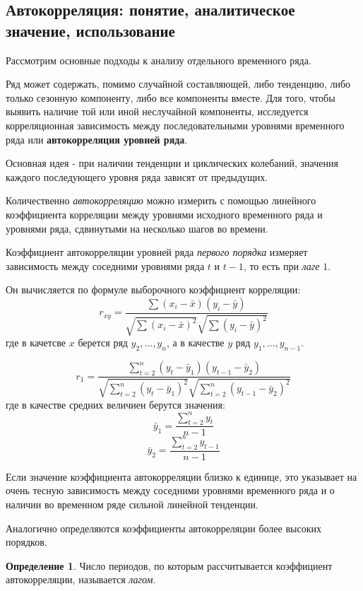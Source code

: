 \documentclass[aps,%
12pt,%
final,%
oneside,
onecolumn,%
musixtex, %
superscriptaddress,%
centertags]{article} %
\theoremstyle{plain}
\theoremstyle{definition}
\newtheorem{definition}{Определение}[subsection]
\theoremstyle{remark}
\begin{document}
\newpage
\subsection{Автокорреляция: понятие, аналитическое значение, использование}

Рассмотрим основные подходы к анализу отдельного временного ряда. 

Ряд может содержать, помимо случайной составляющей, либо тенденцию, либо только сезонную компоненту, либо все компоненты вместе. Для того, чтобы выявить наличие той или иной неслучайной компоненты, исследуется корреляционная зависимость между последовательными уровнями временного ряда или \textbf{автокорреляция уровней ряда}.

Основная идея - при наличии тенденции и циклических колебаний, значения каждого последующего уровня ряда зависят от предыдущих.

Количественно \textit{автокорреляцию} можно измерить с помощью линейного коэффициента корреляции между уровнями исходного временного ряда и уровнями ряда, сдвинутыми на несколько шагов во времени.

Коэффициент автокорреляции уровней ряда \textit{первого порядка} измеряет зависимость между соседними уровнями ряда $t$ и $t-1$, то есть при \textit{лаге} $1$.

Он вычисляется по формуле выборочного коэффициент корреляции:
$$r_{xy} = \frac{\sum(x_i-\bar{x})(y_i - \bar{y})}{\sqrt{\sum(x_i - \bar{x})^2}\sqrt{\sum(y_i - \bar{y})^2}}$$
где в качетсве $x$ берется ряд $y_2,\ldots,y_n$, а в качестве $y$ ряд $y_1,\ldots,y_{n-1}$.

$$r_1 = \frac{\sum\limits_{t=2}^n (y_t - \bar{y}_1)(y_{t-1}-\bar{y}_2)}{\sqrt{\sum\limits_{t=2}^n (y_t - \bar{y}_1)^2 }\sqrt{\sum\limits_{t=2}^n (y_{t-1} - \bar{y}_2)^2 }}$$
где в качестве средних величиен берутся значения:
$$\bar{y}_1 = \frac{\sum\limits_{t=2}^n y_t}{n-1}$$
$$\bar{y}_2 = \frac{\sum\limits_{t=2}^n y_{t-1}}{n-1}$$

Если значение коэффициента автокорреляции близко к единице, это указывает на очень тесную зависимость между соседними уровнями временного ряда и о наличии во временном ряде сильной линейной тенденции.

Аналогично определяются коэффициенты автокорреляции более высоких порядков.

\begin{definition}
	Число периодов, по которым рассчитывается коэффициент автокорреляции, называется \textit{лагом}.
\end{definition}
\end{document}
